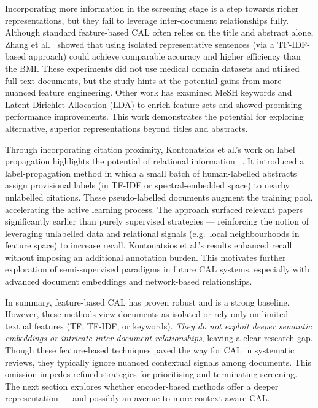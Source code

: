 \documentclass[10pt,oneside]{book}
\begin{document}
Incorporating more information in the screening stage is a step towards richer representations, but they fail to leverage inter-document relationships fully. Although standard feature-based CAL often relies on the title and abstract alone, Zhang et al.~\cite{zhang_evaluating_2020} showed that using isolated representative sentences (via a TF-IDF-based approach) could achieve comparable accuracy and higher efficiency than the BMI. These experiments did not use medical domain datasets and utilised full-text documents, but the study hints at the potential gains from more nuanced feature engineering. Other work has examined MeSH keywords \cite{miwa_reducing_2014} and Latent Dirichlet Allocation (LDA) \cite{hashimoto_topic_2016, miwa_reducing_2014} to enrich feature sets and showed promising performance improvements. This work demonstrates the potential for exploring alternative, superior representations beyond titles and abstracts.

Through incorporating citation proximity, Kontonatsios et al.'s work on label propagation highlights the potential of relational information ~\cite{kontonatsios_semi-supervised_2017}. It introduced a label-propagation method in which a small batch of human-labelled abstracts assign provisional labels (in TF-IDF or spectral-embedded space) to nearby unlabelled citations. These pseudo-labelled documents augment the training pool, accelerating the active learning process. The approach surfaced relevant papers significantly earlier than purely supervised strategies — reinforcing the notion of leveraging unlabelled data and relational signals (e.g.\ local neighbourhoods in feature space) to increase recall. Kontonatsios et al.’s results enhanced recall without imposing an additional annotation burden. This motivates further exploration of semi-supervised paradigms in future CAL systems, especially with advanced document embeddings and network-based relationships.

In summary, feature-based CAL has proven robust and is a strong baseline.  However, these methods view documents as isolated or rely only on limited textual features (TF, TF-IDF, or keywords). \emph{They do not exploit deeper semantic embeddings or intricate inter-document relationships}, leaving a clear research gap. Though these feature-based techniques paved the way for CAL in systematic reviews, they typically ignore nuanced contextual signals among documents. This omission impedes refined strategies for prioritising and terminating screening. The next section explores whether encoder-based methods offer a deeper representation — and possibly an avenue to more context-aware CAL.
\end{document}
